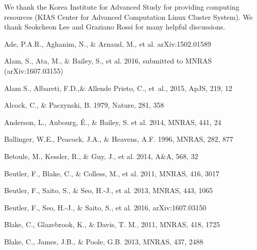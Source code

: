 \documentclass[useAMS,usenatbib]{mnras}
\begin{document}
We thank the Korea Institute for Advanced Study for providing computing resources (KIAS Center for Advanced Computation Linux Cluster System).
We thank Seokcheon Lee and Graziano Rossi for many helpful discussions.


\begin{thebibliography}{}


Ade, P.A.R., Aghanim, N., \& Arnaud, M., et al. arXiv:1502.01589

Alam, S., Ata, M., \& Bailey, S., et al. 2016,
submitted to MNRAS (arXiv:1607.03155)

{Alam} S., Albareti, F.D.,\& Allende Prieto, C., {et~al.}, 2015,  ApJS, 219, 12

Alcock, C., \& Paczynski, B. 1979, Nature, 281, 358  


Anderson, L., Aubourg, \'E., \& Bailey, S. et al. 2014, MNRAS, 441, 24  
  

Ballinger, W.E., Peacock, J.A., \& Heavens, A.F. 1996, MNRAS, 282, 877  

Betoule, M., Kessler, R., \& Guy, J., et al. 2014, A\&A, 568, 32


Beutler, F., Blake, C., \& Colless, M., et al. 2011, MNRAS, 416, 3017

Beutler, F., Saito, S., \& Seo, H.-J., et al. 2013, MNRAS, 443, 1065

Beutler, F., Seo, H.-J., \& Saito, S., et al. 2016,
arXiv:1607.03150

Blake, C., Glazebrook, K., \& Davis, T. M., 2011, MNRAS, 418, 1725  

Blake, C., James, J.B., \& Poole, G.B. 2013, MNRAS, 437, 2488


\end{thebibliography}
\end{document}
